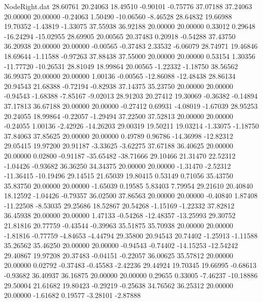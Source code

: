 \begin{filecontents}{NodeRight.dat}
  28.60761   20.24063   18.49510    -0.90101   -0.75776   37.07188   37.24063   20.00000   20.00000   -0.24063    1.50490  -10.06560   -8.46528
  28.64832   19.66988   19.70352    -1.43819   -1.33075   37.55938   36.92188   20.00000   20.00000    0.33012    0.29648  -16.24294  -15.02955
  28.69905   20.00565   20.37483     0.20918   -0.54288   37.43750   36.20938   20.00000   20.00000   -0.00565   -0.37483    2.33532   -6.06079
  28.74971   19.46846   18.69644    -1.11588   -0.97263   37.88438   37.55000   20.00000   20.00000    0.53154    1.30356  -11.77720  -10.26531
  28.81049   18.99864   20.00565    -1.22332   -1.18750   38.56562   36.99375   20.00000   20.00000    1.00136   -0.00565  -12.86088  -12.48438
  28.86134   20.94543   21.68388    -0.72194   -0.82938   37.14375   35.23750   20.00000   20.00000   -0.94543   -1.68388   -7.85167   -9.02013
  28.91203   20.27412   19.30069    -0.36382   -0.14894   37.17813   36.67188   20.00000   20.00000   -0.27412    0.69931   -4.08019   -1.67039
  28.95253   20.24055   18.99864    -0.22057   -1.29494   37.22500   37.52813   20.00000   20.00000   -0.24055    1.00136   -2.42926  -14.26203
  29.00319   19.50211   19.03214    -1.33075   -1.18750   37.84063   37.85625   20.00000   20.00000    0.49789    0.96786  -14.36998  -12.82312
  29.05415   19.97200   20.91187    -3.33625   -3.62275   37.67188   36.40625   20.00000   20.00000    0.02800   -0.91187  -35.65482  -38.71666
  29.10466   21.31470   22.52312    -1.04426   -0.93682   36.36250   34.34375   20.00000   20.00000   -1.31470   -2.52312  -11.36415  -10.19496
  29.14515   21.65039   19.80415     0.53149    0.71056   35.43750   35.83750   20.00000   20.00000   -1.65039    0.19585    5.83403    7.79954
  29.21610   20.40840   18.12592    -1.04426   -0.79357   36.02500   37.86563   20.00000   20.00000   -0.40840    1.87408  -11.22508   -8.53035
  29.25686   18.52867   20.54268    -1.15169   -1.22332   37.82812   36.45938   20.00000   20.00000    1.47133   -0.54268  -12.48357  -13.25993
  29.30752   21.81816   20.77759    -0.43544   -0.39963   35.51875   35.70938   20.00000   20.00000   -1.81816   -0.77759   -4.84653   -4.44794
  29.35800   20.94543   20.74402    -1.25913   -1.11588   35.26562   35.46250   20.00000   20.00000   -0.94543   -0.74402  -14.15253  -12.54242
  29.40867   19.97208   20.37483    -0.04151   -0.22057   36.00625   35.57812   20.00000   20.00000    0.02792   -0.37483   -0.45583   -2.42236
  29.44924   19.70345   19.66995    -0.68613   -0.93682   36.40937   36.16875   20.00000   20.00000    0.29655    0.33005   -7.46237  -10.18886
  29.50004   21.61682   19.80423    -0.29219   -0.25638   34.76562   36.25312   20.00000   20.00000   -1.61682    0.19577   -3.28101   -2.87888

\end{filecontents}
